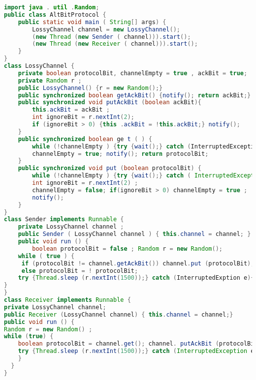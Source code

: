 \documentclass{article}
\begin{document}
\begin{lstlisting}[language=Java]
import java . util .Random;
public class AltBitProtocol {
	public static void main ( String[] args) {
		LossyChannel channel = new LossyChannel();
		(new Thread (new Sender ( channel))).start();
		(new Thread (new Receiver ( channel))).start();
	}
}
class LossyChannel {
	private boolean protocolBit, channelEmpty = true , ackBit = true;
	private Random r ;
	public LossyChannel() {r = new Random();}
	public synchronized boolean getAckBit() {notify(); return ackBit;}
	public synchronized void putAckBit (boolean ackBit){
		this.ackBit = ackBit ;
		int ignoreBit = r.nextInt(2);
		if (ignoreBit > 0) {this .ackBit = !this.ackBit;} notify();
	}
	public synchronized boolean ge t ( ) {
		while (!channelEmpty ) {try {wait();} catch (InterruptedExceptione){}}
		channelEmpty = true; notify(); return protocolBit;
	}
	public synchronized void put (boolean protocolBit) {
		while (!channelEmpty ) {try {wait();} catch ( InterruptedException e){}}
		int ignoreBit = r.nextInt(2) ;
		channelEmpty = false; if(ignoreBit > 0) channelEmpty = true ;
		notify();
	}
}
class Sender implements Runnable {
	private LossyChannel channel ;
	public Sender ( LossyChannel channel ) { this.channel = channel; }
	public void run () {
		boolean protocolBit = false ; Random r = new Random();
	while ( true ) {
	 if (protocolBit != channel.getAckBit()) channel.put (protocolBit);
	 else protocolBit = ! protocolBit;
	try {Thread.sleep (r.nextInt(1500));} catch (InterruptedExption e){}}
}
}
class Receiver implements Runnable {
private LossyChannel channel;
public Receiver (LossyChannel channel) { this.channel = channel;}
public void run () {
Random r = new Random() ;
while (true) {
	boolean protocolBit = channel.get(); channel. putAckBit (protocolBit) ;
	try {Thread.sleep (r.nextInt(1500));} catch (InterruptedException e){}
	}
  }
}
\end{lstlisting}
\end{document}
